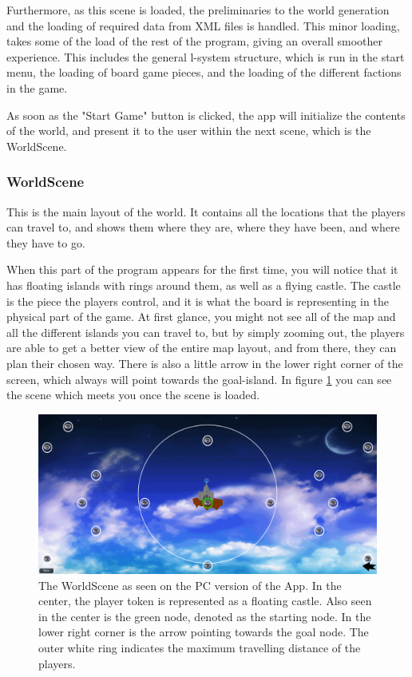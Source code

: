 Furthermore, as this scene is loaded, the preliminaries to the world generation and the loading of required data from XML files is handled. This minor loading, takes some of the load of the rest of the program, giving an overall smoother experience.
This includes the general l-system structure, which is run in the start menu, the loading of board game pieces, and the loading of the different factions in the game.

As soon as the "Start Game" button is clicked, the app will initialize the contents of the world, and present it to the user within the next scene, which is the WorldScene.

\subsubsection{WorldScene}
\label{sec:worldscene}
This is the main layout of the world. It contains all the locations that the players can travel to, and shows them where they are, where they have been, and where they have to go.

When this part of the program appears for the first time, you will notice that it has floating islands with rings around them, as well as a flying castle. The castle is the piece the players control, and it is what the board is representing in the physical part of the game.
At first glance, you might not see all of the map and all the different islands you can travel to, but by simply zooming out, the players are able to get a better view of the entire map layout, and from there, they can plan their chosen way. There is also a little arrow in the lower right corner of the screen, which always will point towards the goal-island. 
In figure \ref{fig:worldSc} you can see the scene which meets you once the scene is loaded.

\begin{figure}[!ht]
    \centering
    \includegraphics[scale=0.3]{Images/WorldScene.png}
    \caption{The WorldScene as seen on the PC version of the App. In the center, the player token is represented as a floating castle. Also seen in the center is the green node, denoted as the starting node. In the lower right corner is the arrow pointing towards the goal node. The outer white ring indicates the maximum travelling distance of the players.}
    \label{fig:worldSc}
\end{figure}

